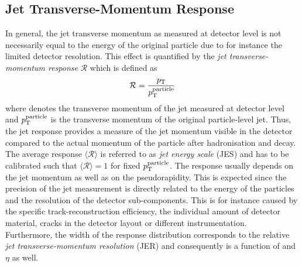 \subsection{Jet Transverse-Momentum Response}
\label{subsec:jets_response}
In general, the jet transverse momentum as measured at detector level is not necessarily equal to the energy of the original particle due to for instance the limited detector resolution. This effect is quantified by the \textit{jet transverse-momentum response} $\mathcal{R}$ which is defined as 
\begin{equation}
  \mathcal{R} = \frac{p_{\text{T}}}{p_{\text{T}}^{\mathrm{particle}}} 
  \label{eq:response}
 \end{equation}
where \pt denotes the transverse momentum of the jet measured at detector level and $p_{\text{T}}^{\rm{particle}}$ is the transverse momentum of the original particle-level jet. Thus, the jet response provides a measure of the jet momentum visible in the detector compared to the actual momentum of the particle after hadronisation and decay. \\
The average response $\langle \mathcal{R} \rangle$ is referred to as \textit{jet energy scale} (JES) and has to be calibrated such that $\langle \mathcal{R} \rangle = 1$ for fixed $p_{\text{T}}^{\mathrm{particle}}$. The response usually depends on the jet momentum as well as on the pseudorapidity. This is expected since the precision of the jet measurement is directly related to the energy of the particles and the resolution of the detector sub-components. This is for instance caused by the specific track-reconstruction efficiency, the individual amount of detector material, cracks in the detector layout or different instrumentation. \\
Furthermore, the width of the response distribution corresponds to the relative \textit{jet transverse-momentum resolution} (JER) and consequently is a function of \pt and $\eta$ as well. 

